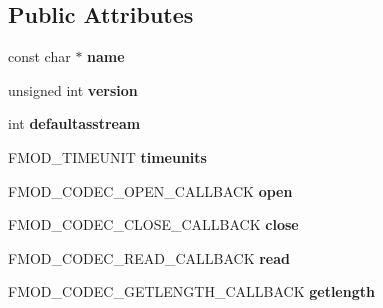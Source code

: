 \subsection*{Public Attributes}
\begin{DoxyCompactItemize}
\item 
\mbox{\label{structFMOD__CODEC__DESCRIPTION_a05940e600ec04e217bdd72c93af52f1d}} 
const char $\ast$ {\bfseries name}
\item 
\mbox{\label{structFMOD__CODEC__DESCRIPTION_a8dfb836ca79931ee6ca39c12bd8aad3f}} 
unsigned int {\bfseries version}
\item 
\mbox{\label{structFMOD__CODEC__DESCRIPTION_ac79461b38a89c34d2ec2e609736df941}} 
int {\bfseries defaultasstream}
\item 
\mbox{\label{structFMOD__CODEC__DESCRIPTION_a17d05f38ea3ea759d20d463aa8a8ca9f}} 
F\+M\+O\+D\+\_\+\+T\+I\+M\+E\+U\+N\+IT {\bfseries timeunits}
\item 
\mbox{\label{structFMOD__CODEC__DESCRIPTION_ab4bc946139795ab97b95f8c7cb1e43b9}} 
F\+M\+O\+D\+\_\+\+C\+O\+D\+E\+C\+\_\+\+O\+P\+E\+N\+\_\+\+C\+A\+L\+L\+B\+A\+CK {\bfseries open}
\item 
\mbox{\label{structFMOD__CODEC__DESCRIPTION_af3804c959e5e4d9e3cf03d4a2eaf7ed8}} 
F\+M\+O\+D\+\_\+\+C\+O\+D\+E\+C\+\_\+\+C\+L\+O\+S\+E\+\_\+\+C\+A\+L\+L\+B\+A\+CK {\bfseries close}
\item 
\mbox{\label{structFMOD__CODEC__DESCRIPTION_abc7836a9cbaecca1c4d5f6b318b0370c}} 
F\+M\+O\+D\+\_\+\+C\+O\+D\+E\+C\+\_\+\+R\+E\+A\+D\+\_\+\+C\+A\+L\+L\+B\+A\+CK {\bfseries read}
\item 
\mbox{\label{structFMOD__CODEC__DESCRIPTION_a4f7b851d2ec478240bc572f7e4318306}} 
F\+M\+O\+D\+\_\+\+C\+O\+D\+E\+C\+\_\+\+G\+E\+T\+L\+E\+N\+G\+T\+H\+\_\+\+C\+A\+L\+L\+B\+A\+CK {\bfseries getlength}
\item 
\mbox{\label{structFMOD__CODEC__DESCRIPTION_aa7fd03795bbeb2599cf28aabe6c23bd7}} 

\end{DoxyCompactItemize}

